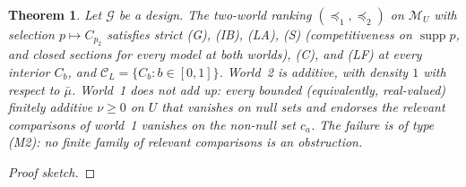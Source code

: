 \documentclass[11pt]{article}
\newtheorem{theorem}{Theorem}[section]
\theoremstyle{definition}
\theoremstyle{remark}
\newcommand{\M}{\mathcal M}
\newcommand{\C}{\mathcal C}
\newcommand{\supp}{\operatorname{supp}}
\begin{document}
\begin{theorem}\label{thm:D21}
Let $\mathcal G$ be a design. The two-world ranking $(\preceq_1,\preceq_2)$ on $\M_U$ with selection $p\mapsto C_{p_2}$ satisfies strict (G), (IB), (LA), (S) (competitiveness on $\supp p$, and closed sections for every model at both worlds), (C), and (LF) at every interior $C_b$, and $\C_L=\{C_b:b\in[0,1]\}$. World~2 is additive, with density $1$ with respect to $\bar\mu$. World~1 does not add up: every bounded (equivalently, real-valued) finitely additive $\nu\ge0$ on $U$ that vanishes on null sets and endorses the relevant comparisons of world~1 vanishes on the non-null set $c_a$. The failure is of type (M2): no finite family of relevant comparisons is an obstruction.
\end{theorem}
\begin{proof}[Proof sketch]

\end{proof}
\end{document}
